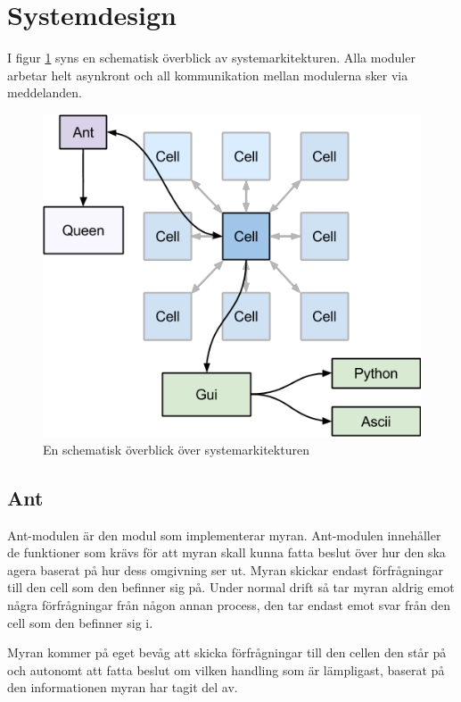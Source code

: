 \section{Systemdesign}

I figur \ref{fig:design} syns en schematisk överblick av systemarkitekturen. Alla moduler arbetar helt asynkront och all kommunikation mellan modulerna sker via meddelanden.

\begin{figure}

\includegraphics[scale=0.8]{Figures/systemdesign.png}
\caption{En schematisk överblick över systemarkitekturen}
\label{fig:design}
\end{figure}

\subsection{Ant}

Ant-modulen är den modul som implementerar myran. Ant-modulen innehåller de funktioner som krävs för att myran skall kunna fatta beslut över hur den ska agera baserat på hur dess omgivning ser ut. Myran skickar endast förfrågningar till den cell som den befinner sig på. Under normal drift så tar myran aldrig emot några förfrågningar från någon annan process, den tar endast emot svar från den cell som den befinner sig i.

Myran kommer på eget bevåg att skicka förfrågningar till den cellen den står på och autonomt att fatta beslut om vilken handling som är lämpligast, baserat på den informationen myran har tagit del av.

